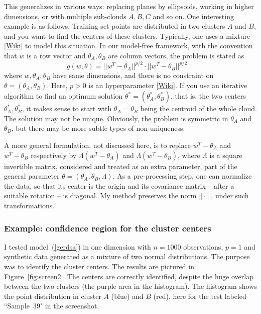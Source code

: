\documentclass[oneside,10pt]{book}
\begin{document}
This generalizes in various ways: replacing planes by ellipsoids, working in higher dimensions, or with multiple sub-clouds
 $A, B, C$ and so on. One interesting example is as follows. Training set points are distributed in two clusters $A$ and $B$, and you want to find the centers of these clusters. Typically, one uses a \textcolor{index}{mixture} [\href{https://en.wikipedia.org/wiki/Mixture_model}{Wiki}] to model this situation.
 In our model-free framework, with the convention that $w$ is a row vector and $\theta_A,\theta_B$ are column vectors, the problem is stated as 
\begin{equation}
g(w,\theta)=||w^T-\theta_A||^{p/2} \cdot ||w^T-\theta_B||^{p/2} \quad \label{gerdsa}
\end{equation}
where $w, \theta_A, \theta_B$ have same dimensions, and there is no constraint on $\theta=(\theta_A,\theta_B)$. Here, $p>0$ is an \textcolor{index}{hyperparameter} [\href{https://en.wikipedia.org/wiki/Hyperparameter_(machine_learning)}{Wiki}]. 
If you use an iterative algorithm to find an optimum solution $\theta^*=(\theta_A^*,\theta_B^*)$, that is, the two centers $\theta_A^*,\theta_B^*$, it makes sense to start with
 $\theta_A=\theta_B$ being the centroid of the whole cloud. The solution may not be unique. Obviously, the problem is symmetric in $\theta_A$ and 
$\theta_B$, but there may be more subtle types of non-uniqueness. 

A more general formulation, not discussed here, is to replace $w^T-\theta_A$ and $w^T-\theta_B$ respectively by 
$\Lambda(w^T-\theta_A)$ and $\Lambda(w^T-\theta_B)$, where $\Lambda$ is a square invertible matrix, considered and treated as an extra parameter,
 part of the general parameter $\theta=(\theta_A,\theta_B,\Lambda)$. As a pre-processing step, one can normalize the data, so that its center is the origin and its covariance matrix -- after a suitable rotation -- is diagonal. My method preserves the norm $||\cdot||$, under such transformations.  

\subsubsection{Example: confidence region for the cluster centers}\label{reserse}

I tested model~(\ref{gerdsa}) in one dimension with $n=1000$ observations, 
 $p=1$ and \textcolor{index}{synthetic data} generated as a mixture of two normal distributions. The purpose was to identify the cluster centers. The results are pictured in Figure~\ref{fig:screen2}.  The centers are correctly identified, despite the huge overlap between the two clusters (the purple area in the histogram). 
The histogram shows the point distribution in cluster $A$ (blue) and $B$ (red), here for the test labeled ``Sample~$39$" in the screenshot.
\end{document}
